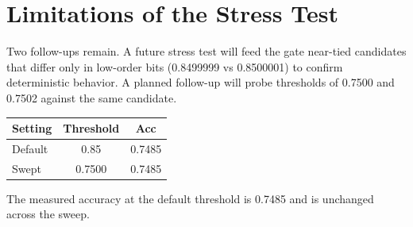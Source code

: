 \section{Limitations of the Stress Test}
Two follow-ups remain. A future stress test will feed the gate near-tied
candidates that differ only in low-order bits (0.8499999 vs 0.8500001) to
confirm deterministic behavior. A planned follow-up will probe thresholds of
0.7500 and 0.7502 against the same candidate.

\begin{table}
\begin{tabular}{lcc}
\toprule
Setting & Threshold & Acc \\
\midrule
Default & 0.85 & 0.7485 \\
Swept & 0.7500 & 0.7485 \\
\bottomrule
\end{tabular}
\end{table}

The measured accuracy at the default threshold is 0.7485 and is unchanged
across the sweep.
